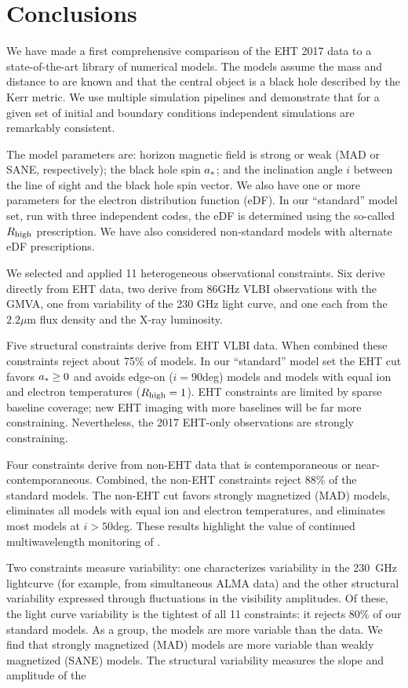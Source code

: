 \section{Conclusions}
\label{sec:conclusions}

We have made a first comprehensive comparison of the EHT 2017 \sgra data to a state-of-the-art library of numerical models.  The models assume the mass and distance to \sgra are known and that the central object is a black hole described by the Kerr metric. We use multiple simulation pipelines and demonstrate that for a given set of initial and boundary conditions independent simulations are remarkably consistent.  

The model parameters are: horizon magnetic field is strong or weak (MAD or SANE, respectively); the black hole spin $a_*$; and the inclination angle $i$ between the line of sight and the black hole spin vector.  We also have one or more parameters for the electron distribution function (eDF).  In our ``standard'' model set, run with three independent codes, the eDF is determined using the so-called $R_\mathrm{high}$ prescription.  We have also considered non-standard models with alternate eDF prescriptions.   

We selected and applied 11 heterogeneous observational constraints.  Six derive directly from EHT data, two derive from 86GHz VLBI observations with the GMVA, one from variability of the 230 GHz light curve, and one each from the $2.2\mu$m flux density and the X-ray luminosity.  

Five structural constraints derive from EHT VLBI data.  When combined these constraints reject about 75\% of models.  In our ``standard'' model set the EHT cut favors $a_* \ge 0$ and avoids edge-on ($i = 90$deg) models and models with equal ion and electron temperatures ($R_\mathrm{high} = 1$).  EHT constraints are limited by sparse baseline coverage; new EHT imaging with more baselines will be far more constraining.  Nevertheless, the 2017  EHT-only observations are strongly constraining.

Four constraints derive from non-EHT data that is contemporaneous or near-contemporaneous.  Combined, the non-EHT constraints reject 88\% of the standard models.  The non-EHT cut favors strongly magnetized (MAD) models, eliminates all models with equal ion and electron temperatures, and eliminates most models at $i > 50$deg.  These results highlight the value of continued multiwavelength monitoring of \sgra.

Two constraints measure variability: one characterizes variability in the 230~GHz lightcurve (for example, from simultaneous ALMA data) and the other structural variability expressed through fluctuations in the visibility amplitudes.  Of these, the light curve variability is the tightest of all 11 constraints: it rejects $80\%$ of our standard models.  As a group, the models are more variable than the data.  We find that strongly magnetized (MAD) models are more variable than weakly magnetized (SANE) models.  The structural variability measures the slope and amplitude of the 

